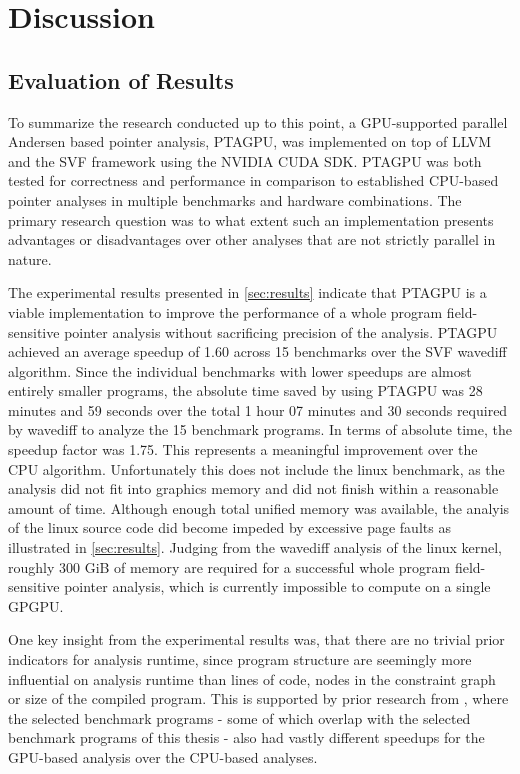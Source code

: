 \chapter{Discussion}\label{chap:conclusion}

\section{Evaluation of Results}
To summarize the research conducted up to this point, a GPU-supported parallel Andersen based pointer analysis, PTAGPU, was implemented on top of LLVM and the SVF framework using the NVIDIA CUDA SDK.
PTAGPU was both tested for correctness and performance in comparison to established CPU-based pointer analyses in multiple benchmarks and hardware combinations.
The primary research question was to what extent such an implementation presents advantages or disadvantages over other analyses that are not strictly parallel in nature.

The experimental results presented in \autoref{sec:results} indicate that PTAGPU is a viable implementation to improve the performance of a whole program field-sensitive pointer analysis without sacrificing precision of the analysis.
PTAGPU achieved an average speedup of 1.60 across 15 benchmarks over the SVF wavediff algorithm. Since the individual benchmarks with lower speedups are almost entirely smaller programs, the absolute time saved by using PTAGPU was 28 minutes and 59 seconds over the total 1 hour 07 minutes and 30 seconds required by wavediff to analyze the 15 benchmark programs. In terms of absolute time, the speedup factor was 1.75.
This represents a meaningful improvement over the CPU algorithm. 
Unfortunately this does not include the linux benchmark, as the analysis did not fit into graphics memory and did not finish within a reasonable amount of time.
Although enough total unified memory was available, the analyis of the linux source code did become impeded by excessive page faults as illustrated in \autoref{sec:results}.
Judging from the wavediff analysis of the linux kernel, roughly 300 GiB of memory are required for a successful whole program field-sensitive pointer analysis, which is currently impossible to compute on a single GPGPU.

One key insight from the experimental results was, that there are no trivial prior indicators for analysis runtime, since program structure are seemingly more influential on analysis runtime than lines of code, nodes in the constraint graph or size of the compiled program.
This is supported by prior research from \cite{mendez2012gpu}, where the selected benchmark programs - some of which overlap with the selected benchmark programs of this thesis - also had vastly different speedups for the GPU-based analysis over the CPU-based analyses.

